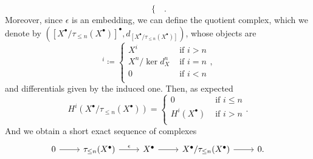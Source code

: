 \begin{defn}
\begin{equation}
\begin{cases}
		\end{cases} 
	.\end{equation} 
	Moreover, since $\epsilon$ is an embedding, we can define the quotient complex,
	which we denote by
	$\left( [X^\bullet/\tau_{\leq n}(X^\bullet)]^{\bullet}, d_{[X^\bullet/\tau_{\leq n}(X^\bullet)]} \right)$,
	whose objects are
	\begin{equation}
		[X^\bullet/\tau_{\leq n}(X^\bullet)]^i \coloneqq 
	\begin{cases}
		X^i & \text{ if } i > n\\
		X^n/\ker d_X^n & \text{ if } i = n\\
		0 & \text{ if } i < n\\
	\end{cases} 
	,\end{equation} 
	and differentials given by the induced one.
	Then, as expected
	\begin{equation}
		H^i \left( X^\bullet/\tau_{\leq n}(X^\bullet) \right) =
		\begin{cases}
			0 & \text{ if } i \leq n\\
			H^i(X^\bullet) & \text{ if } i > n\\
		\end{cases} 
	.\end{equation} 
	And we obtain a short exact sequence of complexes
	\begin{equation*}
	\begin{tikzcd}
		0 \arrow[r, "", rightarrow] &
		\tau_{\leq n}(X^\bullet) \arrow[r, "\epsilon", rightarrow] &
		X^\bullet \arrow[r, "", rightarrow] &
		X^\bullet/ \tau_{\leq n}(X^\bullet) \arrow[r, "", rightarrow] &
		0
	.\end{tikzcd}
	\end{equation*}
\end{defn}


